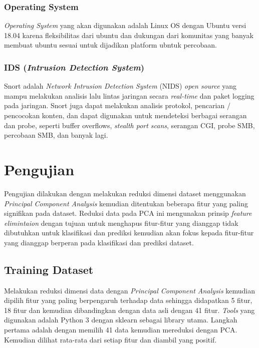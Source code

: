 \subsubsection{Operating System}

\textit{Operating System} yang akan digunakan adalah Linux OS dengan Ubuntu versi 18.04 karena fleksibilitas dari ubuntu dan dukungan dari komunitas yang banyak membuat ubuntu sesuai untuk dijadikan platform ubntuk percobaan.

\subsubsection{IDS (\textit{Intrusion Detection System})}
Snort adalah \textit{Network Intrusion Detection System} (NIDS) \textit{open source} yang mampu melakukan analisis lalu lintas jaringan secara \textit{real-time} dan paket logging pada jaringan. Snort juga dapat melakukan analisis protokol, pencarian / pencocokan konten, dan dapat digunakan untuk mendeteksi berbagai serangan dan probe, seperti buffer overflows, \textit{stealth port scans}, serangan CGI, probe SMB, percobaan SMB, dan banyak lagi.


\section{Pengujian}
Pengujian dilakukan dengan melakukan reduksi dimensi dataset menggunakan \textit{Principal Component Analysis} kemudian ditentukan beberapa fitur yang paling signifikan pada dataset. Reduksi data pada PCA ini mengunakan prinsip \textit{feature elimintaion} dengan tujuan untuk menghapus fitur-fitur yang dianggap tidak dibutuhkan untuk klasifikasi dan prediksi kemudian akan fokus kepada fitur-fitur yang dianggap berperan pada klasifikasi dan prediksi dataset.


\subsection{Training Dataset}

Melakukan reduksi dimensi data dengan \textit{Principal Component Analysis} kemudian dipilih fitur yang paling berpengaruh terhadap data sehingga didapatkan 5 fitur, 18 fitur dan kemudian dibandingkan dengan data asli dengan 41 fitur. \textit{Tools} yang digunakan adalah Python 3 dengan sklearn sebagai library utama. 
Langkah pertama adalah dengan memilih 41 data kemudian mereduksi dengan PCA. Kemudian dilihat rata-rata dari setiap fitur dan diambil yang positif.

